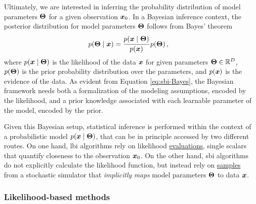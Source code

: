 Ultimately, we are interested in inferring the probability distribution of model parameters $\bm{\Theta}$ for a given observation $\bm{x}_0$. 
In a Bayesian inference context, the posterior distribution for model parameters $\bm{\Theta}$ follows from Bayes' theorem
\begin{equation} \label{eq:sbi-Bayes}
    p(\bm{\Theta}\mid\bm{x})=\cfrac{p(\bm{x}\mid\bm{\Theta})}{p(\bm{x})} \, p(\bm{\Theta}) \, ,
\end{equation}
where $p(\bm{x}\mid\bm{\Theta})$ is the likelihood of the data $\bm{x}$ for given parameters $\bm{\Theta} \in \mathbb{R}^D$, $p(\bm{\Theta})$ is the prior probability distribution over the parameters, and $p(\bm{x})$ is the evidence of the data.  
As evident from Equation \eqref{eq:sbi-Bayes}, the Bayesian framework needs both a formalization of the modeling assumptions, encoded by the likelihood, and a prior knowledge associated with each learnable parameter of the model, encoded by the prior. %
 
Given this Bayesian setup, statistical inference is performed within the context of a probabilistic model $p(\bm{x}\mid\bm{\Theta})$, that can be in principle accessed by two different routes. On one hand, \gls*{lbi} algorithms rely on likelihood \underline{evaluations}, single scalars that quantify closeness to the observation $\bm{x}_0$. On the other hand, \gls*{sbi} algorithms do not explicitly calculate the likelihood function, but instead rely on \underline{samples} from a stochastic simulator that \emph{implicitly maps} model parameters $\bm{\Theta}$ to data $\bm{x}$.

\vspace{0.3cm}
\subsubsection{Likelihood-based methods}

